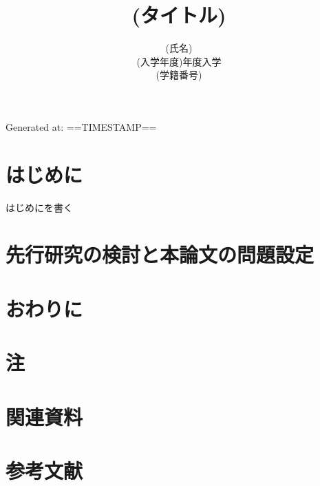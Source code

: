 \documentclass[a4paper,12pt]{jsarticle}
\begin{document}
Generated at: ==TIMESTAMP==
\title{(タイトル)}
\author{(氏名)\\(入学年度)年度入学\\(学籍番号)}
\date{}
\maketitle
\thispagestyle{empty}
\newpage


\setcounter{page}{1}
\tableofcontents
\newpage

\section*{はじめに}
はじめにを書く

\newpage
\section{先行研究の検討と本論文の問題設定}

\newpage
\section*{おわりに}


\newpage
\section*{注}
\theendnotes

\newpage
\section*{関連資料}

\newpage
\section*{参考文献}

\end{document}
